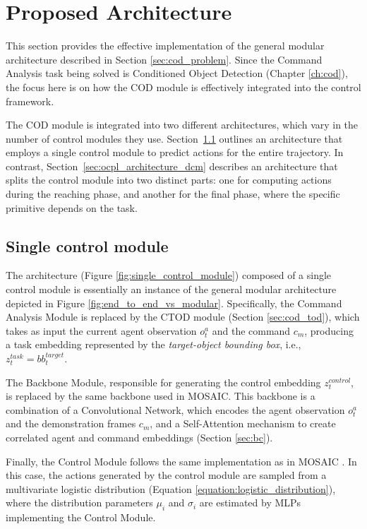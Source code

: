 \section{Proposed Architecture}
\label{sec:ocpl_architecture}
This section provides the effective implementation of the general modular architecture described in Section \ref{sec:cod_problem}. Since the Command Analysis task being solved is Conditioned Object Detection (Chapter \ref{ch:cod}), the focus here is on how the COD module is effectively integrated into the control framework.

The COD module is integrated into two different architectures, which vary in the number of control modules they use. Section~\ref{sec:ocpl_architecture_scm} outlines an architecture that employs a single control module to predict actions for the entire trajectory. In contrast, Section~\ref{sec:ocpl_architecture_dcm} describes an architecture that splits the control module into two distinct parts: one for computing actions during the reaching phase, and another for the final phase, where the specific primitive depends on the task.

\subsection{Single control module}
\label{sec:ocpl_architecture_scm}
The architecture (Figure \ref{fig:single_control_module}) composed of a single control module is essentially an instance of the general modular architecture depicted in Figure \ref{fig:end_to_end_vs_modular}. Specifically, the Command Analysis Module is replaced by the CTOD module (Section \ref{sec:cod_tod}), which takes as input the current agent observation $o^a_t$ and the command $c_m$, producing a task embedding represented by the \textit{target-object bounding box}, i.e., $z^{task}_t = bb^{target}_t$.

The Backbone Module, responsible for generating the control embedding $z^{control}_{t}$, is replaced by the same backbone used in MOSAIC. This backbone is a combination of a Convolutional Network, which encodes the agent observation $o^a_t$ and the demonstration frames $c_m$, and a Self-Attention mechanism to create correlated agent and command embeddings (Section \ref{sec:bc}). 

Finally, the Control Module follows the same implementation as in MOSAIC \cite{mandi2022towards_more_generalizable_one_shot}. In this case, the actions generated by the control module are sampled from a multivariate logistic distribution (Equation \ref{equation:logistic_distribution}), where the distribution parameters $\mu_{i}$ and $\sigma_{i}$ are estimated by MLPs implementing the Control Module.

